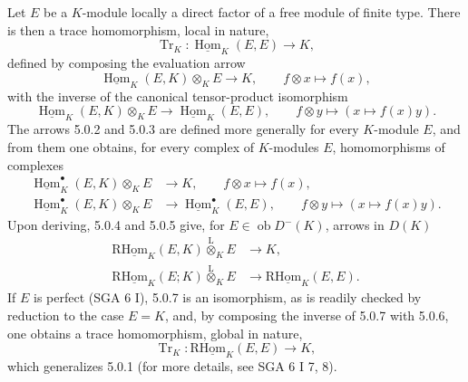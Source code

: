 \documentclass[11pt]{article}
\providecommand{\uHom}{\underline{\Hom}}
\DeclareMathOperator{\Hom}{Hom}
\newcommand{\ob}{\operatorname{ob}}
\providecommand{\Tr}{\operatorname{Tr}}
\providecommand{\Tr}{\operatorname{Tr}}
\providecommand{\lten}{\overset{\mathrm L}{\otimes}}
\providecommand{\Tr}{\operatorname{Tr}}
\providecommand{\Hom}{\operatorname{Hom}}
\providecommand{\ob}{\operatorname{ob}}
\providecommand{\lten}{\overset{\mathrm L}{\otimes}}
\providecommand{\lten}{\overset{\mathrm L}{\otimes}}
\providecommand{\Tr}{\operatorname{Tr}}
\providecommand{\lten}{\overset{\mathrm L}{\otimes}}
\providecommand{\lten}{\overset{\mathrm L}{\otimes}}
\providecommand{\lten}{\overset{\mathrm L}{\otimes}}
\providecommand{\Hom}{\operatorname{Hom}}
\providecommand{\Tr}{\operatorname{Tr}}
\providecommand{\lten}{\overset{\mathrm L}{\otimes}}
\begin{document}
Let $E$ be a $K$-module locally a direct factor of a free module of finite type. There is then a trace homomorphism, local in nature,
\begin{equation}\tag{5.0.1}
\Tr_K:\uHom_K(E,E)\longrightarrow K,
\end{equation}
defined by composing the evaluation arrow
\begin{equation}\tag{5.0.2}
\uHom_K(E,K)\otimes_KE\longrightarrow K,\qquad f\otimes x\longmapsto f(x),
\end{equation}
with the inverse of the canonical tensor-product isomorphism
\begin{equation}\tag{5.0.3}
\uHom_K(E,K)\otimes_KE\longrightarrow\uHom_K(E,E),\qquad f\otimes y\longmapsto (x\longmapsto f(x)y).
\end{equation}
The arrows 5.0.2 and 5.0.3 are defined more generally for every $K$-module $E$, and from them one obtains, for every complex of $K$-modules $E$, homomorphisms of complexes
\begin{align}
\uHom_K^\bullet(E,K)\otimes_KE&\longrightarrow K,\qquad f\otimes x\longmapsto f(x),\tag{5.0.4}\\
\uHom_K^\bullet(E,K)\otimes_KE&\longrightarrow \uHom_K^\bullet(E,E),\qquad f\otimes y\longmapsto (x\longmapsto f(x)y).\tag{5.0.5}
\end{align}
Upon deriving, 5.0.4 and 5.0.5 give, for $E\in\ob D^-(K)$, arrows in $D(K)$
\begin{align}
\mathrm{R}\underline{\mathrm{Hom}}_K(E,K)\lten_KE&\longrightarrow K,\tag{5.0.6}\\
\mathrm{R}\underline{\mathrm{Hom}}_K(E;K)\lten_KE&\longrightarrow\mathrm{R}\underline{\mathrm{Hom}}_K(E,E).\tag{5.0.7}
\end{align}
If $E$ is perfect (SGA 6 I), 5.0.7 is an isomorphism, as is readily checked by reduction to the case $E=K$, and, by composing the inverse of 5.0.7 with 5.0.6, one obtains a trace homomorphism, global in nature,
\begin{equation}\tag{5.0.8}
\Tr_K:\mathrm{R}\underline{\mathrm{Hom}}_K(E,E)\longrightarrow K,
\end{equation}
which generalizes 5.0.1 (for more details, see SGA 6 I 7, 8).
\end{document}
